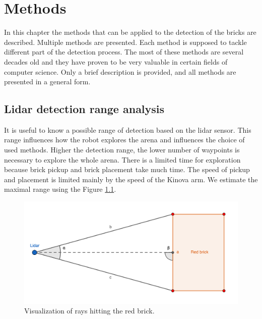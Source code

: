 \chapter{Methods}
\label{ch:methods}
In this chapter the methods that can be applied to the detection of the bricks are described. Multiple methods are presented. Each method is supposed to tackle different part of the detection process. The most of these methods are several decades old and they have proven to be very valuable in certain fields of computer science. Only a brief description is provided, and all methods are presented in a general form. 
\section{Lidar detection range analysis}
It is useful to know a possible range of detection based on the lidar sensor. This range influences how the robot explores the arena and influences the choice of used methods. Higher the detection range, the lower number of waypoints is necessary to explore the whole arena. There is a limited time for exploration because brick pickup and brick placement take much time. The speed of pickup and placement is limited mainly by the speed of the Kinova arm. We estimate the maximal range using the Figure \ref{fig:range}.

\begin{figure}[H]
	\centering
	\includegraphics[scale=1.25]{fig/lidar_range.png}
	\caption[Lidar range study]{Visualization of rays hitting the red brick.}
	\label{fig:range}
\end{figure}

